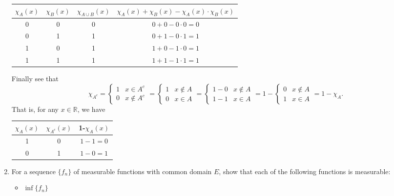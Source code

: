 \begin{enumerate}
\begin{center}
\begin{tabular}{|c c c c|}
        \hline
        $\chi_A(x)$  & $\chi_B(x)$ & $\chi_{A\cup B}(x)$ & $\chi_A(x)+\chi_B(x)-\chi_A(x)\cdot\chi_B(x)$ \\ [0.5ex] 
        \hline\hline
        0 & 0 & 0 & $0+0-0\cdot0=0$   \\ 
        \hline
        0 & 1 & 1 & $0+1-0\cdot1=1$ \\
        \hline
        1 & 0 & 1 & $1+0-1\cdot0=1$  \\
        \hline
        1 & 1 & 1 & $1+1-1\cdot1=1$ \\[1ex] 
        \hline
        \end{tabular}
    \end{center}
    Finally see that
    \[
        \chi_{A^c}=
        \begin{cases}
            1&x\in A^c\\
            0&x\notin A^c
        \end{cases}  
        =
        \begin{cases}
            1&x\notin A\\
            0&x\in A
        \end{cases} 
        =
        \begin{cases}
            1-0&x\notin A\\
            1-1&x\in A
        \end{cases} 
        =
        1-
        \begin{cases}
            0&x\notin A\\
            1&x\in A
        \end{cases} 
        =
        1-\chi_A.
    \]
    That is, for any $x\in\mathbb{R}$, we have
    \begin{center}
        \begin{tabular}{|c c c|} 
        \hline
        $\chi_{A}(x)$ & $\chi_{A^c}(x)$ & 1-$\chi_{A}(x)$ \\ [0.5ex] 
        \hline\hline
        1 & 0 & $1-1=0$  \\ 
        \hline
        0 & 1 & $1-0=1$ \\[1ex] 
        \hline
        \end{tabular}
    \end{center}
    \item For a sequence $\{f_n\}$ of measurable functions with common domain $E$, show that each of the following functions is measurable:
    \begin{itemize}
        \item $\inf\{f_n\}$\\

\end{itemize}
\end{enumerate}
